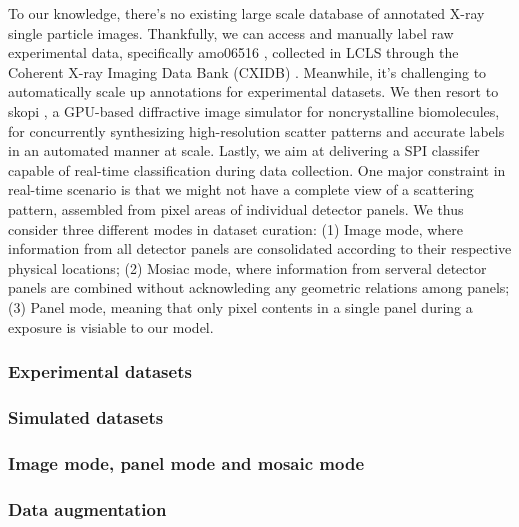To our knowledge, there's no existing large scale database of annotated X-ray
single particle images.  Thankfully, we can access and manually label raw
experimental data, specifically amo06516 \cite{liDiffractionDataAerosolized2020},
collected in LCLS through the Coherent X-ray Imaging Data Bank (CXIDB)
\cite{maiaCoherentXrayImaging2012}.  Meanwhile, it's challenging to
automatically scale up annotations for experimental datasets.  We then resort to
skopi \cite{peckSkopiSimulationPackage2021}, a GPU-based diffractive image
simulator for noncrystalline biomolecules, for concurrently synthesizing
high-resolution scatter patterns and accurate labels in an automated manner at
scale.  Lastly, we aim at delivering a SPI classifer capable of real-time
classification during data collection.  One major constraint in real-time
scenario is that we might not have a complete view of a scattering pattern,
assembled from pixel areas of individual detector panels.  We thus consider
three different modes in dataset curation: (1) Image mode, where information
from all detector panels are consolidated according to their respective physical
locations; (2) Mosiac mode, where information from serveral detector panels are
combined without acknowleding any geometric relations among panels;  (3) Panel
mode, meaning that only pixel contents in a single panel during a exposure is
visiable to our model.  


\subsubsection{Experimental datasets}


\subsubsection{Simulated datasets}


\subsubsection{Image mode, panel mode and mosaic mode}


\subsubsection{Data augmentation}
